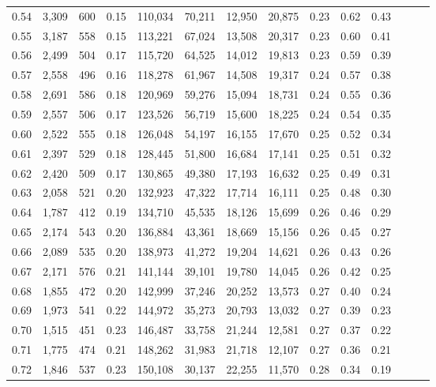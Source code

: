 \begin{tabular}{rrrrrrrrrrrrrr}
0.54 &  3,309 &  600 &  0.15 &  110,034 &   70,211 &  12,950 &  20,875 &  0.23 &  0.62 &      0.43 \\
0.55 &  3,187 &  558 &  0.15 &  113,221 &   67,024 &  13,508 &  20,317 &  0.23 &  0.60 &      0.41 \\
0.56 &  2,499 &  504 &  0.17 &  115,720 &   64,525 &  14,012 &  19,813 &  0.23 &  0.59 &      0.39 \\
0.57 &  2,558 &  496 &  0.16 &  118,278 &   61,967 &  14,508 &  19,317 &  0.24 &  0.57 &      0.38 \\
0.58 &  2,691 &  586 &  0.18 &  120,969 &   59,276 &  15,094 &  18,731 &  0.24 &  0.55 &      0.36 \\
0.59 &  2,557 &  506 &  0.17 &  123,526 &   56,719 &  15,600 &  18,225 &  0.24 &  0.54 &      0.35 \\
0.60 &  2,522 &  555 &  0.18 &  126,048 &   54,197 &  16,155 &  17,670 &  0.25 &  0.52 &      0.34 \\
0.61 &  2,397 &  529 &  0.18 &  128,445 &   51,800 &  16,684 &  17,141 &  0.25 &  0.51 &      0.32 \\
0.62 &  2,420 &  509 &  0.17 &  130,865 &   49,380 &  17,193 &  16,632 &  0.25 &  0.49 &      0.31 \\
0.63 &  2,058 &  521 &  0.20 &  132,923 &   47,322 &  17,714 &  16,111 &  0.25 &  0.48 &      0.30 \\
0.64 &  1,787 &  412 &  0.19 &  134,710 &   45,535 &  18,126 &  15,699 &  0.26 &  0.46 &      0.29 \\
0.65 &  2,174 &  543 &  0.20 &  136,884 &   43,361 &  18,669 &  15,156 &  0.26 &  0.45 &      0.27 \\
0.66 &  2,089 &  535 &  0.20 &  138,973 &   41,272 &  19,204 &  14,621 &  0.26 &  0.43 &      0.26 \\
0.67 &  2,171 &  576 &  0.21 &  141,144 &   39,101 &  19,780 &  14,045 &  0.26 &  0.42 &      0.25 \\
0.68 &  1,855 &  472 &  0.20 &  142,999 &   37,246 &  20,252 &  13,573 &  0.27 &  0.40 &      0.24 \\
0.69 &  1,973 &  541 &  0.22 &  144,972 &   35,273 &  20,793 &  13,032 &  0.27 &  0.39 &      0.23 \\
0.70 &  1,515 &  451 &  0.23 &  146,487 &   33,758 &  21,244 &  12,581 &  0.27 &  0.37 &      0.22 \\
0.71 &  1,775 &  474 &  0.21 &  148,262 &   31,983 &  21,718 &  12,107 &  0.27 &  0.36 &      0.21 \\
0.72 &  1,846 &  537 &  0.23 &  150,108 &   30,137 &  22,255 &  11,570 &  0.28 &  0.34 &      0.19 \\

\end{tabular}
